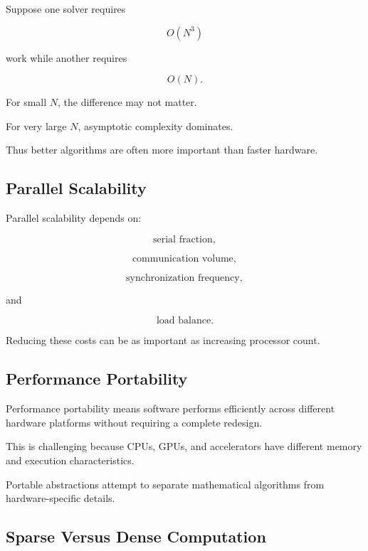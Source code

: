 Suppose one solver requires

\[
O(N^3)
\]

work while another requires

\[
O(N).
\]

For small \(N\), the difference may not matter.

For very large \(N\), asymptotic complexity dominates.

Thus better algorithms are often more important than faster hardware.

\subsection{Parallel Scalability}
\label{subsec:parallel-scalability}

Parallel scalability depends on:

\[
\boxed{
\text{serial fraction},
}
\]

\[
\boxed{
\text{communication volume},
}
\]

\[
\boxed{
\text{synchronization frequency},
}
\]

and

\[
\boxed{
\text{load balance}.
}
\]

Reducing these costs can be as important as increasing processor count.

\subsection{Performance Portability}
\label{subsec:performance-portability}

Performance portability means software performs efficiently across
different hardware platforms without requiring a complete redesign.

This is challenging because CPUs, GPUs, and accelerators have different
memory and execution characteristics.

Portable abstractions attempt to separate mathematical algorithms from
hardware-specific details.

\subsection{Sparse Versus Dense Computation}
\label{subsec:sparse-versus-dense-computation}


